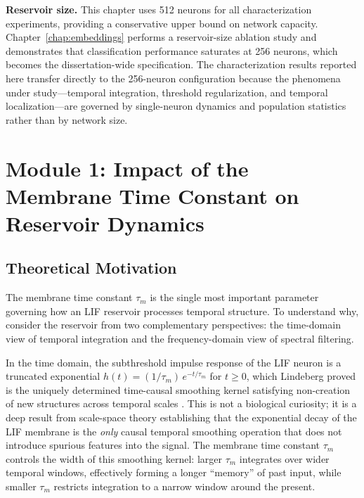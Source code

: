 \textbf{Reservoir size.} This chapter uses 512 neurons for all characterization experiments, providing a conservative upper bound on network capacity. Chapter~\ref{chap:embeddings} performs a reservoir-size ablation study and demonstrates that classification performance saturates at 256 neurons, which becomes the dissertation-wide specification. The characterization results reported here transfer directly to the 256-neuron configuration because the phenomena under study---temporal integration, threshold regularization, and temporal localization---are governed by single-neuron dynamics and population statistics rather than by network size.


\section{Module 1: Impact of the Membrane Time Constant on Reservoir Dynamics}
\label{sec:module1}

\subsection{Theoretical Motivation}

The membrane time constant $\tau_m$ is the single most important parameter governing how an LIF reservoir processes temporal structure. To understand why, consider the reservoir from two complementary perspectives: the time-domain view of temporal integration and the frequency-domain view of spectral filtering.

In the time domain, the subthreshold impulse response of the LIF neuron is a truncated exponential $h(t) = (1/\tau_m)\,e^{-t/\tau_m}$ for $t \geq 0$, which Lindeberg proved is the uniquely determined time-causal smoothing kernel satisfying non-creation of new structures across temporal scales \cite{lindeberg_2016}. This is not a biological curiosity; it is a deep result from scale-space theory establishing that the exponential decay of the LIF membrane is the \emph{only} causal temporal smoothing operation that does not introduce spurious features into the signal. The membrane time constant $\tau_m$ controls the width of this smoothing kernel: larger $\tau_m$ integrates over wider temporal windows, effectively forming a longer ``memory'' of past input, while smaller $\tau_m$ restricts integration to a narrow window around the present.

